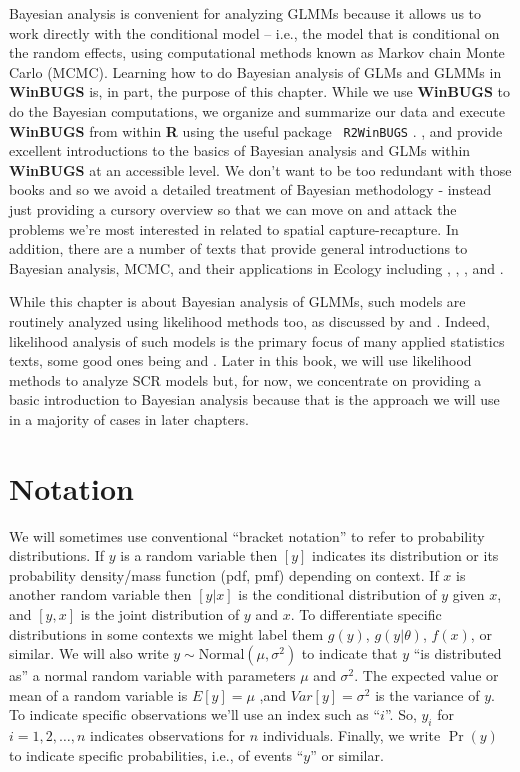 Bayesian analysis is convenient for analyzing GLMMs because it allows
us to work directly with the conditional model -- i.e., the model that
is conditional on the random effects, using computational methods
known as Markov chain Monte Carlo (MCMC). Learning how to do Bayesian
analysis of GLMs and GLMMs in {\bf WinBUGS} is, in part, the purpose
of this chapter.  While we use {\bf WinBUGS} to do the Bayesian
computations, we organize and summarize our data and execute {\bf
  WinBUGS} from within {\bf R} using the useful package \mbox{\tt
  R2WinBUGS} \citep{sturtz_etal:2005}.  \citet{kery:2010}, and
\citet{kery_schaub:2011} provide excellent introductions to the basics
of Bayesian analysis and GLMs within {\bf WinBUGS} at an accessible level. 
We don't want to
be too redundant with those books and so we avoid a detailed
treatment of Bayesian methodology - instead just providing a cursory
overview so that we can move on and attack the problems we're most
interested in related to spatial capture-recapture.  In addition,
there are a number of texts that provide general introductions to
Bayesian analysis, MCMC, and their applications in Ecology including
\citet{mccarthy:2007}, \citet{kery:2010}, \citet{link_barker:2009}, and
\citet{king_etal:2009}.


While this chapter is about Bayesian analysis of GLMMs, such models
are routinely analyzed using likelihood methods too, as discussed by
\citet{royle_dorazio:2008} and \citet{kery:2010}. 
Indeed, likelihood
analysis of such models is the primary focus of many applied
statistics texts, some good ones being \citet{mccullagh_nelder:1989} and \citet{zuur_etal:2009}. Later in
this book, we will use likelihood methods to analyze SCR models but,
for now, we concentrate on providing a basic introduction to Bayesian
analysis because that is the approach we will use in a majority of
cases in later chapters.

\section{ Notation}

We will sometimes use conventional ``bracket notation''  to refer to
probability distributions. If $y$ is a random variable then $[y]$
indicates its distribution or its probability density/mass function
(pdf, pmf) depending on context. If $x$ is another random variable
then $[y|x]$ is the conditional distribution of $y$ given $x$, and
$[y,x]$ is the joint distribution of $y$ and $x$. To differentiate
specific distributions in some contexts we might label them $g(y)$,
$g(y|\theta)$, $f(x)$, or similar. We will also write $y \sim
\mbox{Normal}(\mu,\sigma^{2})$ to indicate that $y$ ``is distributed as'' a normal
random variable with parameters $\mu$ and $\sigma^{2}$. The expected value
or mean of a random variable is $E[y] = \mu$ ,and $Var[y] = \sigma^{2}$ is
the variance of $y$.   To indicate specific observations we'll use an
index such as ``$i$''. So, $y_{i}$ for $i=1,2,\ldots,n$ indicates
observations for $n$ individuals. Finally, we write $\Pr(y)$ to indicate specific probabilities, i.e., of events ``$y$'' or similar.


